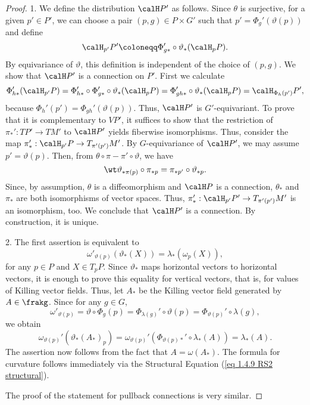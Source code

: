 \begin{proof}
    1. We define the distribution $\calH P'$ as follows. Since $\theta$ is surjective, for a given $p'\in P'$, we can choose a pair $(p,g)\in P\times G'$ such that $p'=\Phi_g'(\vartheta(p))$ and define
    \[\calH_{p'}P'\coloneqq \Phi_{g\ast}'\circ \vartheta_\ast (\calH_{p}P).\]
    By equivariance of $\vartheta$, this definition is independent of the choice of $(p,g)$. We show that $\calH P'$ is a connection on $P'$. First we calculate
    \[\Phi_{h\ast}'(\calH_{p'}P)=\Phi_{h\ast}'\circ \Phi_{g\ast}'\circ\vartheta_\ast(\calH_p P)=\Phi_{gh\ast}'\circ\vartheta_\ast(\calH_pP)=\calH_{\Phi_h(p')}P',\]
    because $\Phi_h'(p')=\Phi_{gh}'(\vartheta(p))$. Thus, $\calH P'$ is $G'$-equivariant. To prove that it is complementary to $VP'$, it suffices to show that the restriction of $\pi_\ast':TP'\to TM'$ to $\calH P'$ yields fiberwise isomorphisms. Thus, consider the map $\pi_\ast':\calH_{p'}P\to T_{\pi'(p')}M'$. By $G$-equivariance of $\calH P'$, we may assume $p'=\vartheta(p)$. Then, from $\theta\circ\pi-\pi'\circ\vartheta$, we have
    \[\wt\vartheta_{\ast\pi(p)}\circ \pi_{\ast p}=\pi_{\ast p'}\circ\vartheta_{\ast p}.\]
    Since, by assumption, $\theta$ is a diffeomorphism and $\calH P$ is a connection, $\theta_\ast$ and $\pi_\ast$ are both isomorphisms of vector spaces. Thus, $\pi_\ast':\calH_{p'}P'\to T_{\pi'(p')}M'$ is an isomorphism, too. We conclude that $\calH P'$ is a connection. By construction, it is unique.

    2. The first assertion is equivalent to
    \[\omega'_{\vartheta(p)}(\vartheta_\ast(X))=\lambda_\ast(\omega_p(X)),\]
    for any $p\in P$ and $X\in T_pP$. Since $\vartheta_\ast$ maps horizontal vectors to horizontal vectors, it is enough to prove this equality for vertical vectors, that is, for values of Killing vector fields. Thus, let $A_\ast$ be the Killing vector field generated by $A\in\frakg$. Since for any $g\in G$,
    \[\omega'_{\vartheta(p)}=\vartheta\circ \Phi_g(p)=\Phi_{\lambda(g)}'\circ\vartheta(p)=\Phi_{\vartheta(p)}'\circ\lambda(g),\]
    we obtain
    \[\omega_{\vartheta(p)}'\left(\vartheta_\ast(A_\ast)_p\right)=\omega_{\vartheta(p)}'\left(\Phi_{\vartheta(p)\ast}'\circ \lambda_\ast(A)\right)=\lambda_\ast(A).\]
    The assertion now follows from the fact that $A=\omega(A_\ast)$. The formula for curvature follows immediately via the Structural Equation (\ref{eq 1.4.9 RS2 structural}).

    The proof of the statement for pullback connections is very similar.
\end{proof}

